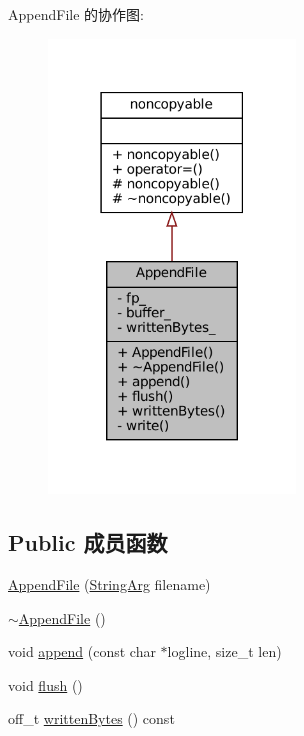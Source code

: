 Append\+File 的协作图\+:
\nopagebreak
\begin{figure}[H]
\begin{center}
\leavevmode
\includegraphics[width=186pt]{classmuduo_1_1FileUtil_1_1AppendFile__coll__graph}
\end{center}
\end{figure}
\subsection*{Public 成员函数}
\begin{DoxyCompactItemize}
\item 
\hyperlink{classmuduo_1_1FileUtil_1_1AppendFile_afab98ee95471530b1192c3d0fd4bdabf}{Append\+File} (\hyperlink{classmuduo_1_1StringArg}{String\+Arg} filename)
\item 
\hyperlink{classmuduo_1_1FileUtil_1_1AppendFile_a24fec9f403479899ba3c30761d0db0c4}{$\sim$\+Append\+File} ()
\item 
void \hyperlink{classmuduo_1_1FileUtil_1_1AppendFile_a201a938319b6ec6100d2eadb013709bf}{append} (const char $\ast$logline, size\+\_\+t len)
\item 
void \hyperlink{classmuduo_1_1FileUtil_1_1AppendFile_adac116554b543b7c4228c018a85882f5}{flush} ()
\item 
off\+\_\+t \hyperlink{classmuduo_1_1FileUtil_1_1AppendFile_ade77694c7d5e90cc2b491704aa94754a}{written\+Bytes} () const
\end{DoxyCompactItemize}

